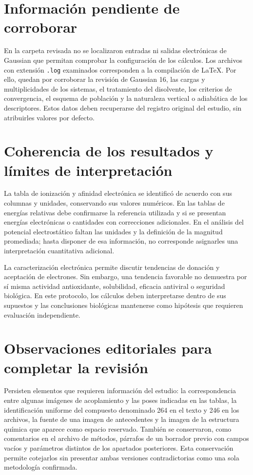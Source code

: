 \documentclass[12 pt, letter, oneside]{book}
\begin{document}
\section{Información pendiente de corroborar}
En la carpeta revisada no se localizaron entradas ni salidas electrónicas de Gaussian que permitan comprobar la configuración de los cálculos. Los archivos con extensión \texttt{.log} examinados corresponden a la compilación de LaTeX. Por ello, quedan por corroborar la revisión de Gaussian 16, las cargas y multiplicidades de los sistemas, el tratamiento del disolvente, los criterios de convergencia, el esquema de población y la naturaleza vertical o adiabática de los descriptores. Estos datos deben recuperarse del registro original del estudio, sin atribuirles valores por defecto.

\section{Coherencia de los resultados y límites de interpretación}
La tabla de ionización y afinidad electrónica se identificó de acuerdo con sus columnas y unidades, conservando sus valores numéricos. En las tablas de energías relativas debe confirmarse la referencia utilizada y si se presentan energías electrónicas o cantidades con correcciones adicionales. En el análisis del potencial electrostático faltan las unidades y la definición de la magnitud promediada; hasta disponer de esa información, no corresponde asignarles una interpretación cuantitativa adicional.

La caracterización electrónica permite discutir tendencias de donación y aceptación de electrones. Sin embargo, una tendencia favorable no demuestra por sí misma actividad antioxidante, solubilidad, eficacia antiviral o seguridad biológica. En este protocolo, los cálculos deben interpretarse dentro de sus supuestos y las conclusiones biológicas mantenerse como hipótesis que requieren evaluación independiente.

\section{Observaciones editoriales para completar la revisión}
Persisten elementos que requieren información del estudio: la correspondencia entre algunas imágenes de acoplamiento y las poses indicadas en las tablas, la identificación uniforme del compuesto denominado 264 en el texto y 246 en los archivos, la fuente de una imagen de antecedentes y la imagen de la estructura química que aparece como espacio reservado. También se conservaron, como comentarios en el archivo de métodos, párrafos de un borrador previo con campos vacíos y parámetros distintos de los apartados posteriores. Esta conservación permite cotejarlos sin presentar ambas versiones contradictorias como una sola metodología confirmada.
\end{document}
